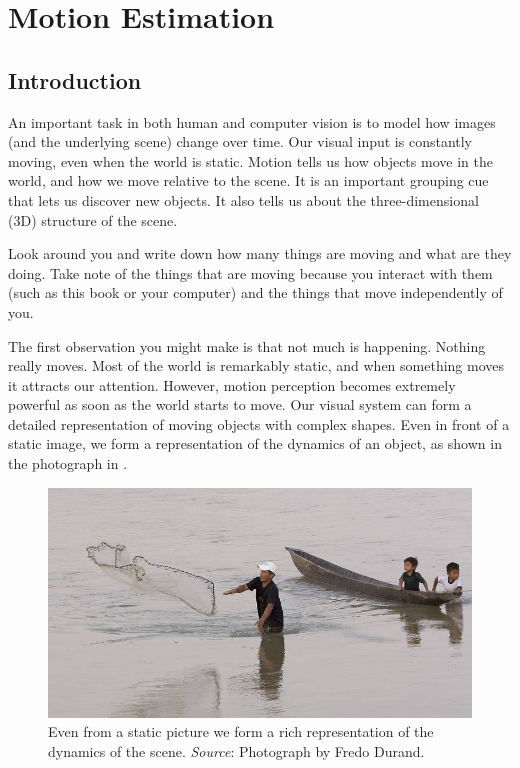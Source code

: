 
\chapter{Motion Estimation}
\label{chapter:motion_estimation}


\section{Introduction}

An important task in both human and computer vision is to model how images (and the underlying scene) change over time. Our visual input is constantly moving, even when the world is static. Motion tells us how objects move in the world, and how we move relative to the scene. It is an important grouping cue that lets us discover new objects. It also tells us about the three-dimensional (3D) structure of the scene.

Look around you and write down how many things are moving and what are they doing. Take note of the things that are moving because you interact with them (such as this book or your computer) and the things that move independently of you.

The first observation you might make is that not much is happening. Nothing really moves. Most of the world is remarkably static, and when something moves it attracts our attention. However, motion perception becomes extremely powerful as soon as the world starts to move. Our visual system can form a detailed representation of moving objects with complex shapes. Even in front of a static image, we form a representation of the dynamics of an object, as shown in the photograph in \fig{\ref{fig:050822_172806__MG_5366}}.

\begin{figure}[t]
    \centerline{
        \includegraphics[width=.7\linewidth]{figures/optical_flow/050822_172806__MG_5366.jpg}
    }
    \caption{Even from a static picture we form a rich representation of the dynamics of the scene. {\em Source}: Photograph by Fredo Durand.}
    \label{fig:050822_172806__MG_5366}
\end{figure}

